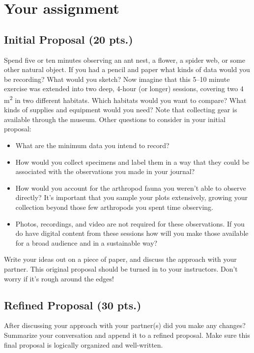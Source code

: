 \documentclass[letterpaper, 11pt]{article}
\begin{document}
\section*{Your assignment}

\subsection*{Initial Proposal (20 pts.)}
Spend five or ten minutes observing an ant nest, a flower, a spider web, or some other natural object. If you had a pencil and paper what kinds of data would you be recording? What would you sketch? Now imagine that this 5--10 minute exercise was extended into two deep, 4-hour (or longer) sessions, covering two 4 m\textsuperscript{2} in two different habitats. Which habitats would you want to compare? What kinds of supplies and equipment would you need? Note that collecting gear is available through the museum. Other questions to consider in your initial proposal:
\begin{itemize}
\item What are the minimum data you intend to record?
\item How would you collect specimens and label them in a way that they could be associated with the observations you made in your journal? 
\item How would you account for the arthropod fauna you weren't able to observe directly? It's important that you sample your plots extensively, growing your collection beyond those few arthropods you spent time observing.
\item Photos, recordings, and video are not required for these observations. If you do have digital content from these sessions how will you make those available for a broad audience and in a sustainable way?
\end{itemize}

\noindent{}Write your ideas out on a piece of paper, and discuss the approach with your partner. This original proposal should be turned in to your instructors. Don't worry if it's rough around the edges!

\subsection*{Refined Proposal (30 pts.)}
After discussing your approach with your partner(s) did you make any changes? Summarize your conversation and append it to a refined proposal. Make sure this final proposal is logically organized and well-written.
\end{document}
